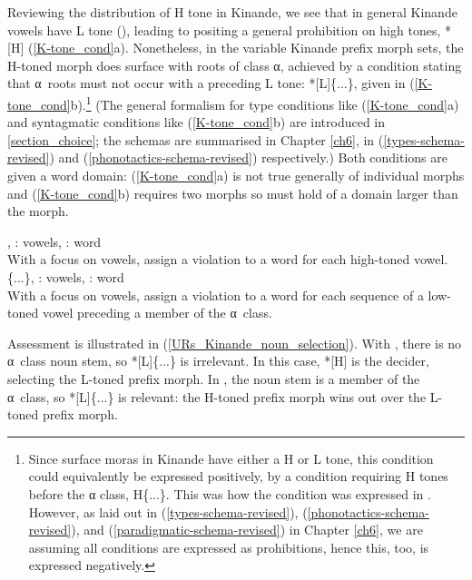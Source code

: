 Reviewing the distribution of H tone in Kinande, we see that in general  Kinande vowels have L tone (\citealt{Pulleyblank:1986, Mutaka:1994}), leading to positing a general prohibition on high tones, *[H] (\ref{K-tone_cond}a). Nonetheless, in the variable Kinande prefix morph sets, the H-toned morph does surface with roots of class α, achieved by a condition stating that α\ roots must not occur with a preceding L tone: {*[L]\{...\}}, given in (\ref{K-tone_cond}b).\footnote{Since surface moras in Kinande have either a H or L tone, this condition could equivalently be expressed positively, by a condition requiring H tones before the {α} class, H\{...\}. This was how the condition was expressed in \citet{Archangeli+:2015_K-tone}. However, as laid out in (\ref{types-schema-revised}), (\ref{phonotactics-schema-revised}), and (\ref{paradigmatic-schema-revised}) in Chapter \ref{ch6}, we are assuming all conditions are expressed as prohibitions, hence this, too, is expressed negatively.} (The general formalism for type conditions  like (\ref{K-tone_cond}a) and syntagmatic conditions like  (\ref{K-tone_cond}b) are introduced in \textsection\ref{section_choice}; the schemas are summarised in Chapter \ref{ch6}, in (\ref{types-schema-revised}) and (\ref{phonotactics-schema-revised}) respectively.) Both conditions are given a word domain: (\ref{K-tone_cond}a) is not true generally of individual morphs and (\ref{K-tone_cond}b) requires two morphs so must hold of a domain larger than the morph.


\begin{example} {}\label{K-tone_cond}
\ea *[H], \tier: vowels, \dom: word\\
With a focus on vowels, assign a violation to a word for each high-toned vowel.
\ex *[L]\{...\}, \tier: vowels, \dom: word\\
With a focus on vowels, assign a violation to a word  for each sequence of a low-toned vowel preceding a member of the α\ class.
\z
\end{example}

Assessment is illustrated in (\ref{URs_Kinande_noun_selection}). With , there is no α\ class noun stem, so *[L]\{...\} is irrelevant. In this case, *[H] is the decider, selecting the L-toned prefix morph. In , the noun stem is a member of the α\ class,  so *[L]\{...\} is relevant: the H-toned prefix morph wins out over the  L-toned prefix morph.



